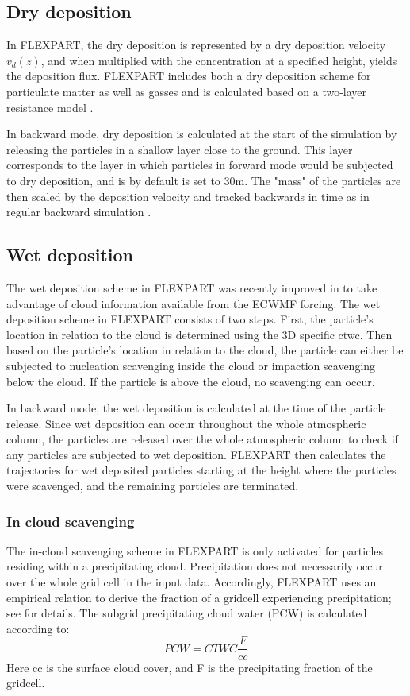 \subsection{Dry deposition}
In FLEXPART, the dry deposition is represented by a dry deposition velocity $v_d(z)$, and when multiplied with the concentration at a specified height, yields the deposition flux. 
FLEXPART includes both a dry deposition scheme for particulate matter as well as gasses and is calculated based on a two-layer resistance model \parencite{Flexpart-2005_ref_paper}.

In backward mode, dry deposition is calculated at the start of the simulation by releasing the particles in a shallow layer close to the ground. This layer corresponds to the layer in which particles in forward mode would be subjected to dry deposition, and is by default is set to 30m. The "mass" of the particles are then scaled by the deposition velocity and tracked backwards in time as in regular backward simulation \parencite{eckhardt2017source}. 

\subsection{Wet deposition}
The wet deposition scheme in FLEXPART was recently improved in \textcite{flexpart_wetdep} to take advantage of cloud information available from the ECWMF forcing. The wet deposition scheme in FLEXPART consists of two steps.
First, the particle's location in relation to the cloud is determined using the 3D specific \acrfull{ctwc}. Then based on the particle's location in relation to the cloud, the particle can either be subjected to nucleation scavenging inside the cloud or impaction scavenging below the cloud. If the particle is above the cloud, no scavenging can occur. 

In backward mode, the wet deposition is calculated at the time of the particle release. Since wet deposition can occur throughout the whole atmospheric column, the particles are released over the whole atmospheric column to check if any particles are subjected to wet deposition. FLEXPART then calculates the trajectories for wet deposited particles starting at the height where the particles were scavenged, and the remaining particles are terminated.    
\subsubsection{In cloud scavenging}
The in-cloud scavenging scheme in FLEXPART is only activated for particles residing within a precipitating cloud. Precipitation does not necessarily occur over the whole grid cell in the input data. Accordingly, FLEXPART uses an empirical relation to derive the fraction of a gridcell experiencing precipitation; see \textcite{Flexpart-2005_ref_paper} for details. The subgrid precipitating cloud water (PCW) is calculated according to: 
\begin{equation}
    PCW = CTWC\frac{F}{cc}
\end{equation}
Here cc is the surface cloud cover, and F is the precipitating fraction of the gridcell. 

